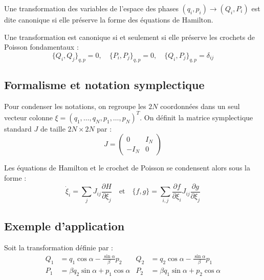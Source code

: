 \documentclass[french]{yLectureNote}
\begin{document}
Une transformation des variables de l'espace des phases $(q_i, p_i) \to (Q_i, P_i)$ est dite canonique si elle préserve la forme des équations de Hamilton.

\begin{theorem}
Une transformation est canonique si et seulement si elle préserve les crochets de Poisson fondamentaux :
\begin{equation}
    \{Q_i, Q_j\}_{q,p} = 0, \quad \{P_i, P_j\}_{q,p} = 0, \quad \{Q_i, P_j\}_{q,p} = \delta_{ij}
\end{equation}
\end{theorem}


\subsection{Formalisme et notation symplectique}
Pour condenser les notations, on regroupe les $2N$ coordonnées dans un seul vecteur colonne $\xi = (q_1, \dots, q_N, p_1, \dots, p_N)^T$. 
On définit la matrice symplectique standard $J$ de taille $2N \times 2N$ par :
\begin{equation}
    J = \begin{pmatrix} 0 & I_N \\ -I_N & 0 \end{pmatrix}
\end{equation}

Les équations de Hamilton et le crochet de Poisson se condensent alors sous la forme :
\begin{equation}
    \dot{\xi}_i = \sum_j J_{ij} \frac{\partial H}{\partial \xi_j} \quad \text{et} \quad \{f,g\} = \sum_{i,j} \frac{\partial f}{\partial \xi_i} J_{ij} \frac{\partial g}{\partial \xi_j}
\end{equation}

\subsection{Exemple d'application}
Soit la transformation définie par :
\begin{align*}
    Q_1 &= q_1 \cos \alpha - \frac{\sin \alpha}{\beta}p_2 & Q_2 &= q_2 \cos \alpha - \frac{\sin \alpha}{\beta}p_1 \\
    P_1 &= \beta q_2 \sin \alpha + p_1 \cos \alpha & P_2 &= \beta q_1 \sin \alpha + p_2 \cos \alpha
\end{align*}
\end{document}
